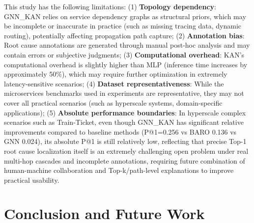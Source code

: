 \documentclass[conference]{IEEEtran}
\begin{document}
This study has the following limitations: (1) \textbf{Topology dependency}: GNN\_KAN relies on service dependency graphs as structural priors, which may be incomplete or inaccurate in practice (such as missing tracing data, dynamic routing), potentially affecting propagation path capture; (2) \textbf{Annotation bias}: Root cause annotations are generated through manual post-hoc analysis and may contain errors or subjective judgments; (3) \textbf{Computational overhead}: KAN's computational overhead is slightly higher than MLP (inference time increases by approximately 50\%), which may require further optimization in extremely latency-sensitive scenarios; (4) \textbf{Dataset representativeness}: While the microservices benchmarks used in experiments are representative, they may not cover all practical scenarios (such as hyperscale systems, domain-specific applications); (5) \textbf{Absolute performance boundaries}: In hyperscale complex scenarios such as Train-Ticket, even though GNN\_KAN has significant relative improvements compared to baseline methods (P@1=0.256 vs BARO 0.136 vs GNN 0.024), its absolute P@1 is still relatively low, reflecting that precise Top-1 root cause localization itself is an extremely challenging open problem under real multi-hop cascades and incomplete annotations, requiring future combination of human-machine collaboration and Top-k/path-level explanations to improve practical usability.

\section{Conclusion and Future Work}
\end{document}
